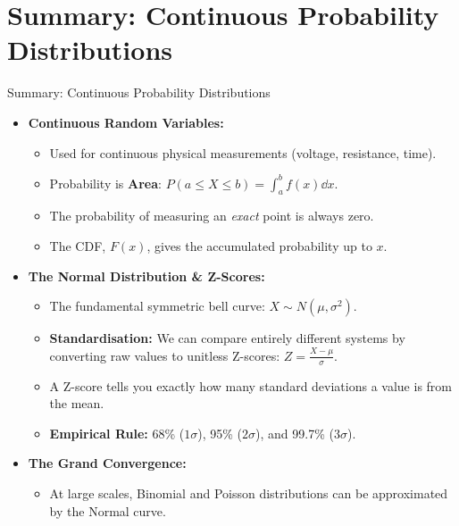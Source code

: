 \section{Summary: Continuous Probability Distributions}
\begin{frame}{Summary: Continuous Probability Distributions}
    \begin{itemize}
        \item \textbf{Continuous Random Variables:}
        \begin{itemize}
            \item Used for continuous physical measurements (voltage, resistance, time).
            \item Probability is \textbf{Area}: $P(a \leq X \leq b) = \int_{a}^{b} f(x) \dd x$.
            \item The probability of measuring an \textit{exact} point is always zero.
            \item The CDF, $F(x)$, gives the accumulated probability up to $x$.
        \end{itemize}
        
        \item \textbf{The Normal Distribution \& Z-Scores:}
        \begin{itemize}
            \item The fundamental symmetric bell curve: $X \sim N(\mu, \sigma^2)$.
            \item \textbf{Standardisation:} We can compare entirely different systems by converting raw values to unitless Z-scores: $Z = \frac{X - \mu}{\sigma}$.
            \item A Z-score tells you exactly how many standard deviations a value is from the mean.
            \item \textbf{Empirical Rule:} 68\% ($1\sigma$), 95\% ($2\sigma$), and 99.7\% ($3\sigma$).
        \end{itemize}
        
        \item \textbf{The Grand Convergence:}
        \begin{itemize}
\item At large scales, Binomial and Poisson distributions can be approximated by the Normal curve.
        \end{itemize}
    \end{itemize}
\end{frame}


     